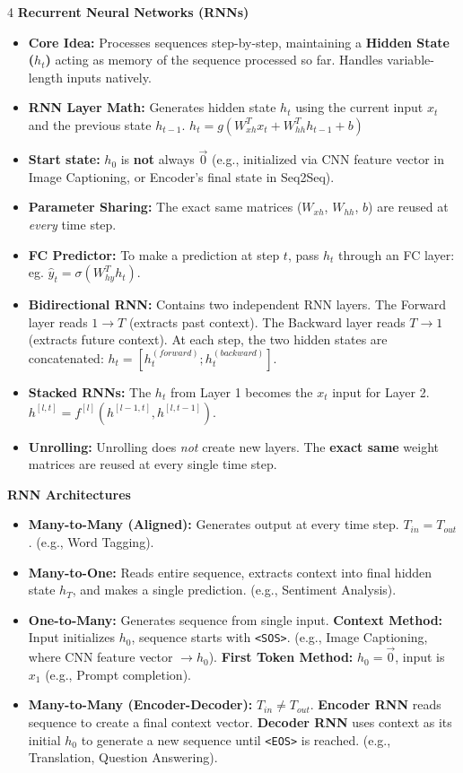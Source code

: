 \documentclass[8pt,landscape,a4paper]{extarticle}
\begin{document}
\begin{multicols*}{4}
\noindent\textbf{Recurrent Neural Networks (RNNs)}
\begin{itemize}[leftmargin=*, nosep]
    \item \textbf{Core Idea:} Processes sequences step-by-step, maintaining a \textbf{Hidden State ($h_t$)} acting as memory of the sequence processed so far. Handles variable-length inputs natively.
    \item \textbf{RNN Layer Math:} Generates hidden state $h_t$ using the current input $x_t$ and the previous state $h_{t-1}$. 
    $h_t = g(W_{xh}^T x_t + W_{hh}^T h_{t-1} + b)$
    \item \textbf{Start state:} $h_0$ is \textbf{not} always $\vec{0}$ (e.g., initialized via CNN feature vector in Image Captioning, or Encoder's final state in Seq2Seq).
    \item \textbf{Parameter Sharing:} The exact same matrices ($W_{xh}$, $W_{hh}$, $b$) are reused at \textit{every} time step. 
    \item \textbf{FC Predictor:} To make a prediction at step $t$, pass $h_t$ through an FC layer: eg. $\hat{y}_t = \sigma(W_{hy}^T h_t)$.
    \item \textbf{Bidirectional RNN:} Contains two independent RNN layers. The Forward layer reads $1 \rightarrow T$ (extracts past context). The Backward layer reads $T \rightarrow 1$ (extracts future context). At each step, the two hidden states are concatenated: $h_t = [h^{(forward)}_t ; h^{(backward)}_t]$.
    \item \textbf{Stacked RNNs:} The $h_t$ from Layer 1 becomes the $x_t$ input for Layer 2. $h^{[l, t]} = f^{[l]}(h^{[l-1, t]}, h^{[l, t-1]})$.
    \item \textbf{Unrolling:} Unrolling does \textit{not} create new layers. The \textbf{exact same} weight matrices are reused at every single time step.
\end{itemize}


\vspace{1mm}
\noindent\textbf{RNN Architectures}
\begin{itemize}[leftmargin=*, nosep]
    \item \textbf{Many-to-Many (Aligned):} Generates output at every time step. $T_{in} = T_{out}$. (e.g., Word Tagging).
    \item \textbf{Many-to-One:} Reads entire sequence, extracts context into final hidden state $h_T$, and makes a single prediction. (e.g., Sentiment Analysis).
    \item \textbf{One-to-Many:} Generates sequence from single input. \textbf{Context Method:} Input initializes $h_0$, sequence starts with \texttt{<SOS>}. (e.g., Image Captioning, where CNN feature vector $\rightarrow h_0$). \textbf{First Token Method:} $h_0 = \vec{0}$, input is $x_1$ (e.g., Prompt completion).
    \item \textbf{Many-to-Many (Encoder-Decoder):} $T_{in} \neq T_{out}$. \textbf{Encoder RNN} reads sequence to create a final context vector. \textbf{Decoder RNN} uses context as its initial $h_0$ to generate a new sequence until \texttt{<EOS>} is reached. (e.g., Translation, Question Answering).
\end{itemize}


\end{multicols*}
\end{document}

